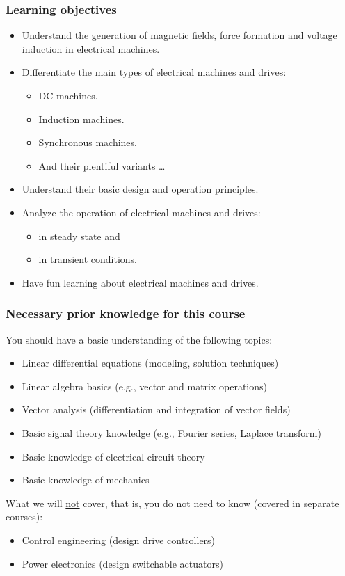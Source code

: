 \begin{frame}
	\frametitle{Learning objectives}
	\begin{itemize}
		\item Understand the generation of magnetic fields, force formation and voltage induction in electrical machines.
		\item<2-> Differentiate the main types of electrical machines and drives:
		\begin{itemize}
			\item DC machines. 
			\item Induction machines.
			\item Synchronous machines.
			\item And their plentiful variants \ldots
		\end{itemize}
		\item<3-> Understand their basic design and operation principles.
		\item<4-> Analyze the operation of electrical machines and drives:
		\begin{itemize}
			\item in steady state and
			\item in transient conditions.
		\end{itemize} 
		\item<5-> Have fun learning about electrical machines and drives.
	\end{itemize}
\end{frame}

\begin{frame}
	\frametitle{Necessary prior knowledge for this course}
	You should have a basic understanding of the following topics:
	\begin{itemize}
		\item Linear differential equations (modeling, solution techniques)
		\item Linear algebra basics (e.g., vector and matrix operations)
		\item Vector analysis (differentiation and integration of vector fields)
		\item Basic signal theory knowledge (e.g., Fourier series, Laplace transform)
		\item Basic knowledge of electrical circuit theory
		\item Basic knowledge of mechanics
	\end{itemize}
	\vspace{0.5cm}
	What we will \underline{not} cover, that is, you do not need to know (covered in separate courses):
	\begin{itemize}
		\item Control engineering (design drive controllers)
		\item Power electronics (design switchable actuators)
	\end{itemize}
\end{frame}

